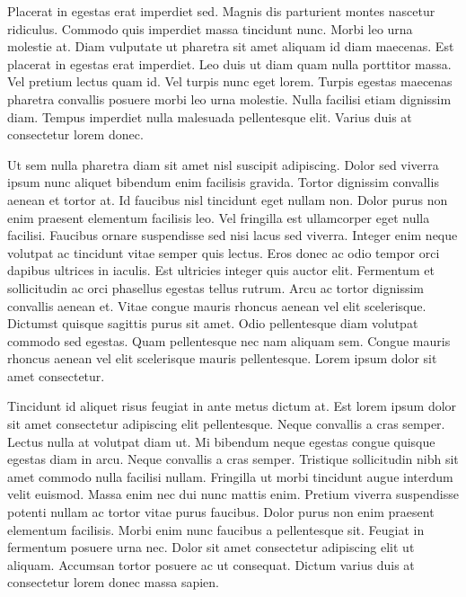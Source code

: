 \documentclass[11pt,a4paper]{article}
\begin{document}
Placerat in egestas erat imperdiet sed. Magnis dis parturient montes nascetur ridiculus. Commodo quis imperdiet massa tincidunt nunc. Morbi leo urna molestie at. Diam vulputate ut pharetra sit amet aliquam id diam maecenas. Est placerat in egestas erat imperdiet. Leo duis ut diam quam nulla porttitor massa. Vel pretium lectus quam id. Vel turpis nunc eget lorem. Turpis egestas maecenas pharetra convallis posuere morbi leo urna molestie. Nulla facilisi etiam dignissim diam. Tempus imperdiet nulla malesuada pellentesque elit. Varius duis at consectetur lorem donec.

Ut sem nulla pharetra diam sit amet nisl suscipit adipiscing. Dolor sed viverra ipsum nunc aliquet bibendum enim facilisis gravida. Tortor dignissim convallis aenean et tortor at. Id faucibus nisl tincidunt eget nullam non. Dolor purus non enim praesent elementum facilisis leo. Vel fringilla est ullamcorper eget nulla facilisi. Faucibus ornare suspendisse sed nisi lacus sed viverra. Integer enim neque volutpat ac tincidunt vitae semper quis lectus. Eros donec ac odio tempor orci dapibus ultrices in iaculis. Est ultricies integer quis auctor elit. Fermentum et sollicitudin ac orci phasellus egestas tellus rutrum. Arcu ac tortor dignissim convallis aenean et. Vitae congue mauris rhoncus aenean vel elit scelerisque. Dictumst quisque sagittis purus sit amet. Odio pellentesque diam volutpat commodo sed egestas. Quam pellentesque nec nam aliquam sem. Congue mauris rhoncus aenean vel elit scelerisque mauris pellentesque. Lorem ipsum dolor sit amet consectetur.

Tincidunt id aliquet risus feugiat in ante metus dictum at. Est lorem ipsum dolor sit amet consectetur adipiscing elit pellentesque. Neque convallis a cras semper. Lectus nulla at volutpat diam ut. Mi bibendum neque egestas congue quisque egestas diam in arcu. Neque convallis a cras semper. Tristique sollicitudin nibh sit amet commodo nulla facilisi nullam. Fringilla ut morbi tincidunt augue interdum velit euismod. Massa enim nec dui nunc mattis enim. Pretium viverra suspendisse potenti nullam ac tortor vitae purus faucibus. Dolor purus non enim praesent elementum facilisis. Morbi enim nunc faucibus a pellentesque sit. Feugiat in fermentum posuere urna nec. Dolor sit amet consectetur adipiscing elit ut aliquam. Accumsan tortor posuere ac ut consequat. Dictum varius duis at consectetur lorem donec massa sapien.
\end{document}
